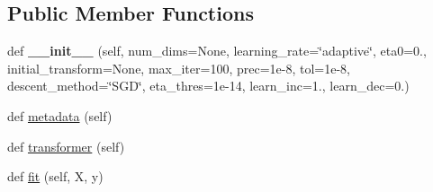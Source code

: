 \subsection*{Public Member Functions}
\begin{DoxyCompactItemize}
\item 
def {\bfseries \+\_\+\+\_\+init\+\_\+\+\_\+} (self, num\+\_\+dims=None, learning\+\_\+rate=\char`\"{}adaptive\char`\"{}, eta0=0., initial\+\_\+transform=None, max\+\_\+iter=100, prec=1e-\/8, tol=1e-\/8, descent\+\_\+method=\char`\"{}\+S\+G\+D\char`\"{}, eta\+\_\+thres=1e-\/14, learn\+\_\+inc=1., learn\+\_\+dec=0.)\hypertarget{classdml_1_1nca_1_1NCA_a86bb8dcbd925eb0be6479ab0e0d3fb22}{}\label{classdml_1_1nca_1_1NCA_a86bb8dcbd925eb0be6479ab0e0d3fb22}

\item 
def \hyperlink{classdml_1_1nca_1_1NCA_adb91f357b09c4c4188c6425a537b9330}{metadata} (self)
\item 
def \hyperlink{classdml_1_1nca_1_1NCA_a5d302fa9ea28b6857f3f9b2b7efb7c99}{transformer} (self)
\item 
def \hyperlink{classdml_1_1nca_1_1NCA_af8a6f753d4d4cc1b49d6dfdb8b44d73a}{fit} (self, X, y)
\end{DoxyCompactItemize}
